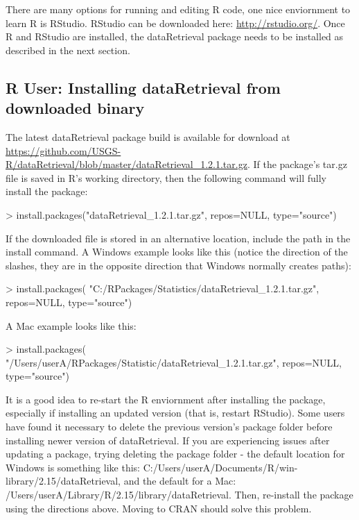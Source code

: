 \documentclass[a4paper,11pt]{article}
\begin{document}
There are many options for running and editing R code, one nice enviornment to learn R is RStudio. RStudio can be downloaded here: \url{http://rstudio.org/}. Once R and RStudio are installed, the dataRetrieval package needs to be installed as described in the next section.

\subsection{R User: Installing dataRetrieval from downloaded binary}
The latest dataRetrieval package build is available for download at \url{https://github.com/USGS-R/dataRetrieval/blob/master/dataRetrieval_1.2.1.tar.gz}.  If the package's tar.gz file is saved in R's working directory, then the following command will fully install the package:

\begin{Schunk}
\begin{Sinput}
> install.packages("dataRetrieval_1.2.1.tar.gz", 
                  repos=NULL, type="source")
\end{Sinput}
\end{Schunk}

If the downloaded file is stored in an alternative location, include the path in the install command.  A Windows example looks like this (notice the direction of the slashes, they are in the opposite direction that Windows normally creates paths):

\begin{Schunk}
\begin{Sinput}
> install.packages(
   "C:/RPackages/Statistics/dataRetrieval_1.2.1.tar.gz", 
   repos=NULL, type="source")
\end{Sinput}
\end{Schunk}

A Mac example looks like this:

\begin{Schunk}
\begin{Sinput}
> install.packages(
   "/Users/userA/RPackages/Statistic/dataRetrieval_1.2.1.tar.gz", 
   repos=NULL, type="source")
\end{Sinput}
\end{Schunk}

It is a good idea to re-start the R enviornment after installing the package, especially if installing an updated version (that is, restart RStudio). Some users have found it necessary to delete the previous version's package folder before installing newer version of dataRetrieval. If you are experiencing issues after updating a package, trying deleting the package folder - the default location for Windows is something like this: C:/Users/userA/Documents/R/win-library/2.15/dataRetrieval, and the default for a Mac: /Users/userA/Library/R/2.15/library/dataRetrieval. Then, re-install the package using the directions above. Moving to CRAN should solve this problem.
\end{document}
